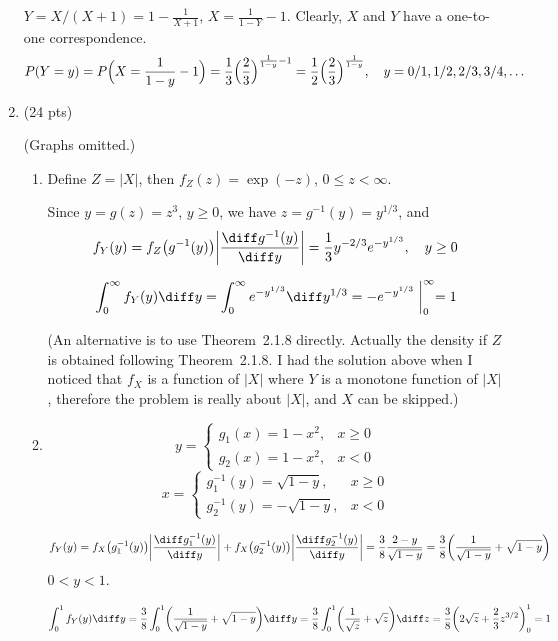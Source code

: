 \documentclass[12pt]{article}
\begin{document}
\begin{enumerate}
$Y = X / (X + 1) = 1 - \frac{1}{X + 1}$,
$X = \frac{1}{1 - Y} - 1$.
Clearly, $X$ and $Y$ have a one-to-one correspondence.
\[
P(Y = y)
= P\Bigl(X = \frac{1}{1 - y} - 1\Bigr)
= \frac{1}{3} \Bigl(\frac{2}{3}\Bigr)^{\frac{1}{1-y} - 1}
= \frac{1}{2} \Bigl(\frac{2}{3}\Bigr)^{\frac{1}{1-y}}
,\quad
y = 0/1, 1/2, 2/3, 3/4,\dotso
\]

\item (24 pts)

(Graphs omitted.)

\begin{enumerate}
\item
Define $Z = |X|$, then
$f_Z(z) = \exp(-z)$, $0 \le z < \infty$.

Since
$y = g(z) = z^3$, $y \ge 0$,
we have
$z = g^{-1}(y) = y^{1/3}$, and
\[
f_Y(y)
= f_Z\bigl(g^{-1}(y)\bigr)
    \biggl|\frac{\diff g^{-1}(y)}{\diff y}\biggr|
= \frac{1}{3} y^{-2/3} e^{-y^{1/3}}
,\quad
y \ge 0
\]

\[
\int_0^\infty f_Y(y) \diff y
= \int_0^\infty e^{-y^{1/3}} \diff y^{1/3}
= -e^{-y^{1/3}} \biggm|_0^\infty
= 1
\]

(An alternative is to use Theorem~2.1.8 directly.
Actually the density if $Z$ is obtained following Theorem~2.1.8.
I had the solution above when I noticed that $f_X$ is a function of
$|X|$ where $Y$ is a monotone function of $|X|$, therefore
the problem is really about $|X|$, and $X$ can be skipped.)

\item
\[
y =
\begin{cases}
    g_1(x) = 1 - x^2, & x \ge 0\\
    g_2(x) = 1 - x^2, & x < 0
\end{cases}
\]
\[
x =
\begin{cases}
g_1^{-1}(y) = \sqrt{1 - y}, & x \ge 0\\
g_2^{-1}(y) = -\sqrt{1 - y}, & x < 0
\end{cases}
\]

\[
f_Y(y)
= f_X\bigl(g_1^{-1}(y)\bigr)
    \biggl|\frac{\diff g_1^{-1}(y)}{\diff y}\biggr|
+ f_X\bigl(g_2^{-1}(y)\bigr)
    \biggl|\frac{\diff g_2^{-1}(y)}{\diff y}\biggr|
= \frac{3}{8} \frac{2 - y}{\sqrt{1 - y}}
= \frac{3}{8}\biggl(\frac{1}{\sqrt{1 - y}} + \sqrt{1 - y}\biggr)
\]
$0 < y < 1$.

\[
\int_0^1 f_Y(y) \diff y
= \frac{3}{8} \int_0^1 \biggl(\frac{1}{\sqrt{1-y}} + \sqrt{1-y}\biggr)
    \diff y
= \frac{3}{8} \int_0^1 \biggl(\frac{1}{\sqrt{z}} + \sqrt{z}\biggr)
    \diff z
= \frac{3}{8}\biggl(2\sqrt{z} + \frac{2}{3} z^{3/2}\biggr)_0^1
= 1
\]
\end{enumerate}


\end{enumerate}
\end{document}
